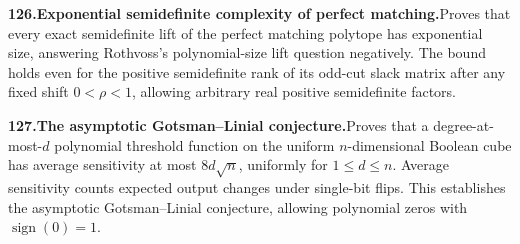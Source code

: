 \documentclass[11pt,a4paper]{article}
\begin{document}
  \par \begin{minipage}{\linewidth}
  \fontsize{10.5}{12.6}\selectfont\RaggedRight
  \hypertarget{result 126}{}
  {\bfseries\textcolor{muted}{126.}\enspace Exponential semidefinite complexity of perfect matching.}\enspace Proves that every exact semidefinite lift of the perfect matching polytope has exponential size, answering Rothvoss's polynomial-size lift question negatively. The bound holds even for the positive semidefinite rank of its odd-cut slack matrix after any fixed shift $0<\rho<1$, allowing arbitrary real positive semidefinite factors.\par
  \end{minipage}\par\vspace{5pt}



  \par \begin{minipage}{\linewidth}
  \fontsize{10.5}{12.6}\selectfont\RaggedRight
  \hypertarget{result 127}{}
  {\bfseries\textcolor{muted}{127.}\enspace The asymptotic Gotsman--Linial conjecture.}\enspace Proves that a degree-at-most-$d$ polynomial threshold function on the uniform $n$-dimensional Boolean cube has average sensitivity at most $8d\sqrt n$, uniformly for $1\le d\le n$. Average sensitivity counts expected output changes under single-bit flips. This establishes the asymptotic Gotsman--Linial conjecture, allowing polynomial zeros with $\operatorname{sign}(0)=1$.\par
  \end{minipage}\par\vspace{5pt}
\end{document}
